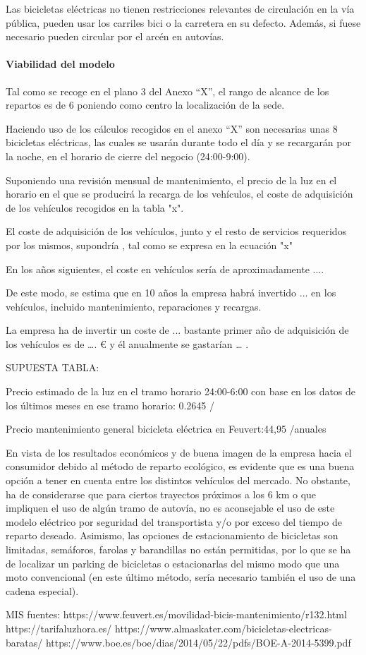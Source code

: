Las bicicletas eléctricas no tienen restricciones relevantes de circulación en la vía pública, pueden usar los carriles bici o la carretera en su defecto. Además, si fuese necesario pueden circular por el arcén en autovías.

\paragraph{Viabilidad del modelo}

Tal como se recoge en el plano 3 del Anexo “X”, el rango de alcance de los repartos es de 6  poniendo como centro la localización de la sede.

Haciendo uso de los cálculos recogidos en el anexo “X” son necesarias unas 8 bicicletas eléctricas, las cuales se usarán durante todo el día y se recargarán por la noche, en el horario de cierre del negocio (24:00-9:00).

Suponiendo una revisión mensual de mantenimiento, el precio de la luz en el horario en el que se producirá la recarga de los vehículos, el coste de adquisición de los vehículos recogidos en la tabla "x". 

El coste de adquisición de los vehículos, junto y el resto de servicios requeridos por los mismos, supondría , tal como se expresa en la ecuación "x"

En los años siguientes, el coste en vehículos sería de aproximadamente ....

De este modo, se estima que en 10 años la empresa habrá invertido ...  en los vehículos, incluido mantenimiento, reparaciones y recargas.

La empresa ha de invertir un coste de ... bastante primer año de adquisición de los vehículos es de …. € y él anualmente se gastarían … .


SUPUESTA TABLA:

Precio estimado de la luz en el tramo horario 24:00-6:00 con base en los datos de los últimos meses en ese tramo horario: 0.2645 /

Precio mantenimiento general bicicleta eléctrica en Feuvert:44,95 /anuales



En vista de los resultados económicos y de buena imagen de la empresa hacia el consumidor debido al método de reparto ecológico, es evidente que es una buena opción a tener en cuenta entre los distintos vehículos del mercado. No obstante, ha de considerarse que para ciertos trayectos próximos a los 6 km o que impliquen el uso de algún tramo de autovía, no es aconsejable el uso de este modelo eléctrico por seguridad del transportista y/o por exceso del tiempo de reparto deseado. Asimismo, las opciones de estacionamiento de bicicletas son limitadas, semáforos, farolas y barandillas no están permitidas, por lo que se ha de localizar un parking de bicicletas o estacionarlas del mismo modo que una moto convencional (en este último método, sería necesario también el uso de una cadena especial).

MIS fuentes:
https://www.feuvert.es/movilidad-bicis-mantenimiento/r132.html
https://tarifaluzhora.es/
https://www.almaskater.com/bicicletas-electricas-baratas/
https://www.boe.es/boe/dias/2014/05/22/pdfs/BOE-A-2014-5399.pdf
